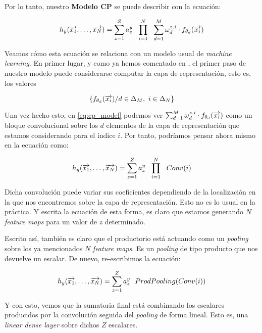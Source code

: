 Por lo tanto, nuestro \textbf{Modelo CP} se puede describir con la ecuación:

\begin{equation} \label{eq:cp_model}
    h_y(\overrightarrow{x_1}, \ldots, \overrightarrow{x_N}) =  \sum_{z = 1}^Z a_z^y \ \  \prod_{i = 1}^N \ \  \sum_{d = 1}^{M} \omega^{z, i}_d \cdot f_{\theta_{d}}(\overrightarrow{x_i})
\end{equation}

Veamos cómo esta ecuación se relaciona con un modelo usual de \textit{machine learning}. En primer lugar, y como ya hemos comentado en , el primer paso de nuestro modelo puede considerarse computar la capa de representación, esto es, los valores

$$\{f_{\theta_d}(\overrightarrow{x_i}) / d \in \Delta_{M},\ i \in \Delta_{N} \}$$

Una vez hecho esto, en \eqref{eq:cp_model} podemos ver $\sum_{d = 1}^{M} \omega^{z, i}_d \cdot f_{\theta_{d}}(\overrightarrow{x_i})$ como un bloque convolucional sobre los $d$ elementos de la capa de representación que estamos considerando para el índice $i$. Por tanto, podríamos pensar ahora mismo en la ecuación como:

\begin{equation}
    h_y(\overrightarrow{x_1}, \ldots, \overrightarrow{x_N}) =  \sum_{z = 1}^Z a_z^y \ \  \prod_{i = 1}^N \ \  Conv(i)
\end{equation}

Dicha convolución puede variar sus coeficientes dependiendo de la localización en la que nos encontremos sobre la capa de representación. Esto no es lo usual en la práctica. Y escrita la ecuación de esta forma, es claro que estamos generando $N$ \textit{feature maps} para un valor de $z$ determinado.

Escrito así, también es claro que el productorio está actuando como un \textit{pooling} sobre los ya mencionados $N$ \textit{feature maps}. Es un \textit{pooling} de tipo producto que nos devuelve un escalar. De nuevo, re-escribimos la ecuación:

\begin{equation}
    h_y(\overrightarrow{x_1}, \ldots, \overrightarrow{x_N}) =  \sum_{z = 1}^Z a_z^y \ \  ProdPooling( Conv(i) )
\end{equation}

Y con esto, vemos que la sumatoria final está combinando los escalares producidos por la convolución seguida del \textit{pooling} de forma lineal. Esto es, una \textit{linear dense layer} sobre dichos $Z$ escalares.

